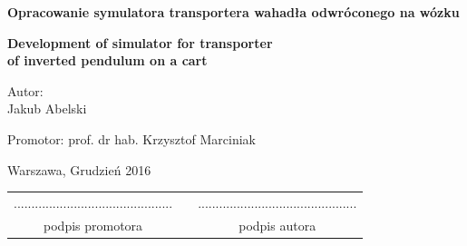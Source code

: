 \documentclass[12pt, oneside]{report}
\theoremstyle{definition}
\begin{document}
\begin{titlepage}
\linespread{1.5}
\begin{center}
\Huge
\textbf{Opracowanie symulatora transportera wahadła odwróconego na wózku}
\end{center}

\begin{center}
\Large
\textbf{Development of simulator for transporter \\of inverted pendulum on a cart}
\end{center}


\vfill
\begin{center}
\Large
Autor:\\
\LARGE Jakub Abelski
\end{center}
\vfill
\begin{center}
\Large
Promotor: prof. dr hab. Krzysztof Marciniak
\end{center}
\vfill
\begin{center}
\large
Warszawa, Grudzień 2016
\end{center}

\newpage
\hfill
\begin{table}[b]
\centering
\begin{tabular}[t]{ccc}
............................................. & \hspace*{100pt} & .............................................\\
podpis promotora & \hspace*{100pt} & podpis autora
\end{tabular}
\end{table}
\end{titlepage}

\setlength{\parindent}{5ex}
\end{document}

